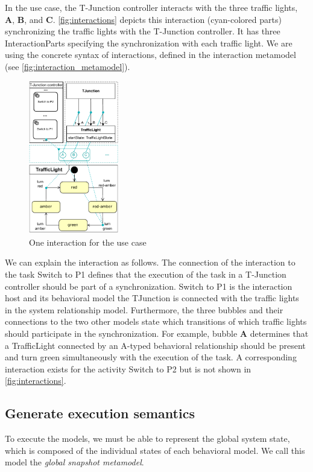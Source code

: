 \documentclass{jot}
\begin{document}
In the use case, the T-Junction controller interacts with the three traffic lights, \textbf{A}, \textbf{B}, and \textbf{C}.
\autoref{fig:interactions} depicts this interaction (cyan-colored parts) synchronizing the traffic lights with the T-Junction controller.
It has three \textsf{InteractionPart}s specifying the synchronization with each traffic light.
We are using the concrete syntax of interactions, defined in the interaction metamodel (see \autoref{fig:interaction_metamodel}).

\begin{figure}[h]
    \centering
    \includegraphics[width=0.35\textwidth]{figures/interactions.pdf}
    \caption{One interaction for the use case}
    \label{fig:interactions}
\end{figure}

We can explain the interaction as follows.
The connection of the interaction to the task \textsf{Switch to P1} defines that the execution of the task in a \textsf{T-Junction controller} should be part of a synchronization.
\textsf{Switch to P1} is the interaction host and its behavioral model the \textsf{TJunction} is connected with the traffic lights in the system relationship model.
Furthermore, the three bubbles and their connections to the two other models state which transitions of which traffic lights should participate in the synchronization.
For example, bubble \textbf{A} determines that a \textsf{TrafficLight} connected by an A-typed behavioral relationship should be present and \textsf{turn green} simultaneously with the execution of the task.
A corresponding interaction exists for the activity \textsf{Switch to P2} but is not shown in \autoref{fig:interactions}.

\subsection{Generate execution semantics} \label{subsec:executionSemantics}
To execute the models, we must be able to represent the global system state, which is composed of the individual states of each behavioral model.
We call this model the \emph{global snapshot metamodel}.
\end{document}
